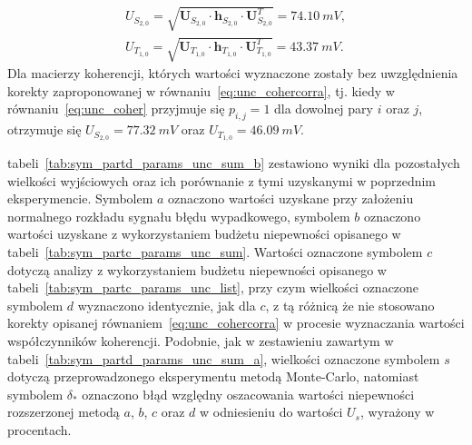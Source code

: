 \begin{gather}
U_{S_{2,0}} = \sqrt{\mathbf{U}_{S_{2,0}} \cdot \mathbf{h}_{S_{2,0}} \cdot \mathbf{U}_{S_{2,0}}^{T}} = \qty{74.10}{mV} \label{eq:sym_partd_output_unc_totalmat_S_2_0}, \\
U_{T_{1,0}} = \sqrt{\mathbf{U}_{T_{1,0}} \cdot \mathbf{h}_{T_{1,0}} \cdot \mathbf{U}_{T_{1,0}}^{T}} = \qty{43.37}{mV} \label{eq:sym_partd_output_unc_totalmat_T_1_0}.
\end{gather}
Dla macierzy koherencji, których wartości wyznaczone zostały bez uwzględnienia korekty zaproponowanej w równaniu~\eqref{eq:unc_cohercorra}, tj. kiedy w równaniu~\eqref{eq:unc_coher} przyjmuje się $p_{i,j} = 1$ dla dowolnej pary $i$ oraz $j$, otrzymuje się $U_{S_{2,0}} = \qty{77.32}{mV}$ oraz $U_{T_{1,0}} = \qty{46.09}{mV}$.

tabeli~\ref{tab:sym_partd_params_unc_sum_b} zestawiono wyniki dla pozostałych wielkości wyjściowych oraz ich porównanie z tymi uzyskanymi w poprzednim eksperymencie. Symbolem $a$ oznaczono wartości uzyskane przy założeniu normalnego rozkładu sygnału błędu wypadkowego, symbolem $b$ oznaczono wartości uzyskane z wykorzystaniem budżetu niepewności opisanego w tabeli~\ref{tab:sym_partc_params_unc_sum}. Wartości oznaczone symbolem $c$ dotyczą analizy z wykorzystaniem budżetu niepewności opisanego w tabeli~\ref{tab:sym_partc_params_unc_list}, przy czym wielkości oznaczone symbolem $d$ wyznaczono identycznie, jak dla $c$, z tą różnicą że nie stosowano korekty opisanej równaniem~\eqref{eq:unc_cohercorra} w procesie wyznaczania wartości współczynników koherencji. Podobnie, jak w zestawieniu zawartym w tabeli~\ref{tab:sym_partd_params_unc_sum_a}, wielkości oznaczone symbolem $s$ dotyczą przeprowadzonego eksperymentu metodą Monte-Carlo, natomiast symbolem $\delta_{*}$ oznaczono błąd względny oszacowania wartości niepewności rozszerzonej metodą $a$, $b$, $c$ oraz $d$ w odniesieniu do wartości $U_{s}$, wyrażony w procentach.

